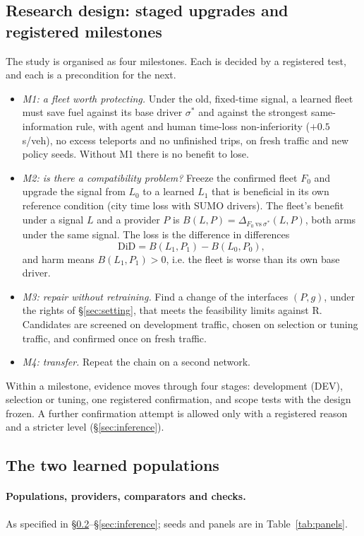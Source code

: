 \documentclass[11pt]{article}
\begin{document}
\subsection{Research design: staged upgrades and registered milestones}\label{sec:design}
The study is organised as four milestones. Each is decided by a registered test, and each is a precondition for the next.
\begin{itemize}\setlength\itemsep{1pt}
\item \emph{M1: a fleet worth protecting.} Under the old, fixed-time signal, a learned fleet must save fuel against its base driver
$\sigma^*$ and against the strongest same-information rule, with agent and human time-loss non-inferiority ($+0.5$\,s/veh), no excess
teleports and no unfinished trips, on fresh traffic and new policy seeds. Without M1 there is no benefit to lose.
\item \emph{M2: is there a compatibility problem?} Freeze the confirmed fleet $F_0$ and upgrade the signal from $L_0$ to a learned $L_1$
that is beneficial in its own reference condition (city time loss with SUMO drivers). The fleet's benefit under a signal $L$ and a provider
$P$ is $B(L,P)=\Delta_{F_0\ \mathrm{vs}\ \sigma^*}(L,P)$, both arms under the same signal. The loss is the difference in differences
\begin{equation}
\mathrm{DiD}=B(L_1,P_1)-B(L_0,P_0),
\end{equation}
and harm means $B(L_1,P_1)>0$, i.e. the fleet is worse than its own base driver.
\item \emph{M3: repair without retraining.} Find a change of the interfaces $(P,g)$, under the rights of §\ref{sec:setting}, that meets the
feasibility limits against R. Candidates are screened on development traffic, chosen on selection or tuning traffic, and confirmed once on
fresh traffic.
\item \emph{M4: transfer.} Repeat the chain on a second network.
\end{itemize}
Within a milestone, evidence moves through four stages: development (DEV), selection or tuning, one registered confirmation, and scope tests
with the design frozen. A further confirmation attempt is allowed only with a registered reason and a stricter level (§\ref{sec:inference}).

\subsection{The two learned populations}\label{sec:populations}
\paragraph{Populations, providers, comparators and checks.} As specified in §\ref{sec:populations}--§\ref{sec:inference}; seeds and
panels are in Table~\ref{tab:panels}.
\end{document}
